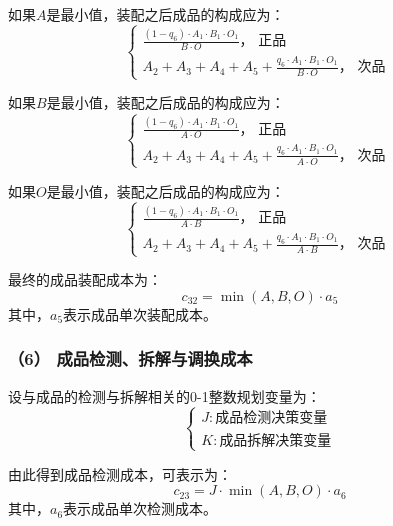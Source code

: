 \documentclass[withoutpreface,bwprint]{cumcmthesis} %
\begin{document}
如果$A$是最小值，装配之后成品的构成应为：
\begin{equation}
	\left\{\begin{array}{l}
		\frac{\left(1-q_6\right) \cdot A_1 \cdot B_1 \cdot O_1}{B \cdot O} \text {， 正品 } \\
		A_2+A_3+A_4+A_5+\frac{q_6 \cdot A_1 \cdot B_1 \cdot O_1}{B \cdot O} \text {， 次品 } 
	\end{array}\right.
\end{equation}

如果$B$是最小值，装配之后成品的构成应为：
\begin{equation}
	\left\{\begin{array}{l}
		\frac{\left(1-q_6\right) \cdot A_1 \cdot B_1 \cdot O_1}{A \cdot O} \text {， 正品 } \\
		A_2+A_3+A_4+A_5+\frac{q_6 \cdot A_1 \cdot B_1 \cdot O_1}{A \cdot O} \text {， 次品 } 
	\end{array}\right.
\end{equation}

如果$O$是最小值，装配之后成品的构成应为：
\begin{equation}
	\left\{\begin{array}{l}
		\frac{\left(1-q_6\right) \cdot A_1 \cdot B_1 \cdot O_1}{A \cdot B} \text {， 正品 } \\
		A_2+A_3+A_4+A_5+\frac{q_6 \cdot A_1 \cdot B_1 \cdot O_1}{A \cdot B} \text {， 次品 } 
	\end{array}\right.
\end{equation}

最终的成品装配成本为：
\begin{equation}
	c_{32}=\min (A, B, O) \cdot a_5
\end{equation}
其中，$a_5$表示成品单次装配成本。
\subsubsection*{（6） 成品检测、拆解与调换成本}
设与成品的检测与拆解相关的0-1整数规划变量为：
\begin{equation}
	\left\{\begin{array}{l}
		J:\text{成品检测决策变量} \\
		K:\text{成品拆解决策变量}
	\end{array}\right.
\end{equation}

由此得到成品检测成本，可表示为：
\begin{equation}
	c_{23}=J \cdot \min (A, B, O) \cdot a_6
\end{equation}
其中，$a_6$表示成品单次检测成本。
\end{document}
